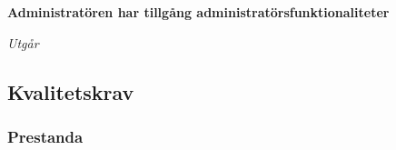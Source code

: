 \documentclass[a4paper]{article}
\begin{document}
\begin{ST}
\item \textbf{Administratören har tillgång administratörsfunktionaliteter} 

\emph{Utgår}
\end{ST}







\subsection{Kvalitetskrav}

\subsubsection{Prestanda}
\end{document}
